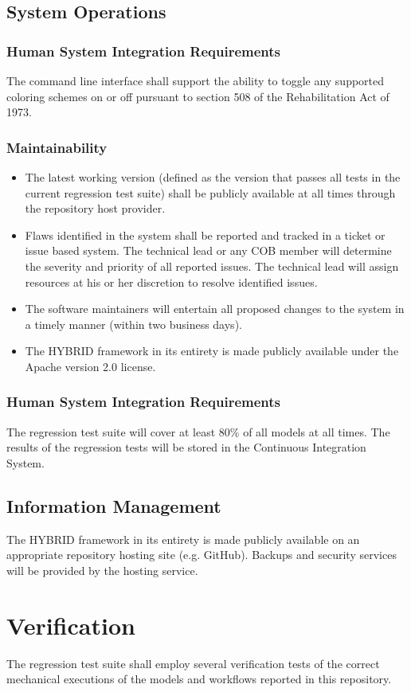 \subsection{System Operations}
\subsubsection{Human System Integration Requirements}
The command line interface shall support the ability to toggle any supported coloring schemes on or off pursuant to section 
508 of the Rehabilitation Act of 1973.
\subsubsection{Maintainability}
\begin{itemize}
  \item The latest working version (defined as the version that passes all tests in the current regression test suite) shall be 
           publicly available at all times through the repository host provider.
  \item  Flaws identified in the system shall be reported and tracked in a ticket or issue based system. The technical lead or 
            any COB member will 
            determine the severity and priority of all reported issues. The technical lead will assign resources at his or her 
            discretion to resolve identified issues.
  \item  The software maintainers will entertain all proposed changes to the system in a timely manner 
           (within two business days).        
  \item  The HYBRID framework in its entirety is made publicly available under the Apache version 2.0 license.
\end{itemize}
\subsubsection{Human System Integration Requirements}
The regression test suite will cover at least 80\% of all models at all times.
The results of the regression tests will be stored in the Continuous Integration System.

\subsection{Information Management}
The HYBRID framework in its entirety is made publicly available on an appropriate repository hosting site (e.g. GitHub).
Backups and security services will be provided by the hosting service.

\section{Verification}
The regression test suite shall employ several verification tests of the correct mechanical executions
of the models and workflows reported in this repository.
